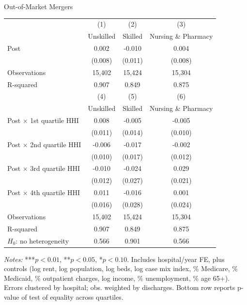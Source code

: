 \documentclass{beamer}
\begin{document}
\begin{frame}{Out-of-Market Mergers}
\scriptsize
\setlength{\tabcolsep}{4pt}
\renewcommand{\arraystretch}{0.9}

\begin{tabular}{lccc}
\toprule
& (1) & (2) & (3) \\
& Unskilled & Skilled & Nursing \& Pharmacy \\
\midrule
Post & 0.002 & -0.010 & 0.004 \\
     & (0.008) & (0.011) & (0.008) \\
\addlinespace
Observations & 15,402 & 15,424 & 15,304 \\
R-squared    & 0.907  & 0.849  & 0.875 \\
\midrule
& (4) & (5) & (6) \\
& Unskilled & Skilled & Nursing \& Pharmacy \\
\midrule
Post $\times$ 1st quartile HHI & 0.008 & -0.005 & -0.005 \\
                               & (0.011) & (0.014) & (0.010) \\
Post $\times$ 2nd quartile HHI & -0.006 & -0.017 & -0.002 \\
                               & (0.010) & (0.017) & (0.012) \\
Post $\times$ 3rd quartile HHI & -0.010 & -0.024 & 0.029 \\
                               & (0.012) & (0.027) & (0.021) \\
Post $\times$ 4th quartile HHI & 0.011 & -0.016 & 0.001 \\
                               & (0.016) & (0.028) & (0.024) \\
\addlinespace
Observations & 15,402 & 15,424 & 15,304 \\
R-squared    & 0.907  & 0.849  & 0.875 \\
\midrule
$H_{0}$: no heterogeneity & 0.566 & 0.901 & 0.566 \\
\bottomrule
\end{tabular}

\medskip
\tiny\emph{Notes:} ***$p<0.01$, **$p<0.05$, *$p<0.10$. Includes hospital/year FE, plus controls (log rent, log population, log beds, log case mix index, \% Medicare, \% Medicaid, \% outpatient charges, log income, \% unemployment, \% age 65+). Errors clustered by hospital; obs. weighted by discharges. Bottom row reports p-value of test of equality across quartiles.
\end{frame}
\end{document}
